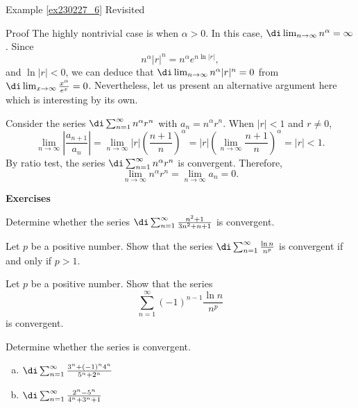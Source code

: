 \begin{example}{\linkt Example \ref{ex230227_6} Revisited}
\begin{example}[label=ex230227_13]{}
\begin{myproof}{Proof}
The highly nontrivial case is when $\alpha>0$. In this case, $\di\lim_{n\to\infty}n^{\alpha}=\infty$. Since
\[n^{\alpha}|r|^n=n^{\alpha}e^{n\ln |r|},\]
and $\ln |r|<0$, we can deduce that $\di \lim_{n\to\infty}n^{\alpha}|r|^n=0$ from $\di\lim_{x\to\infty}\frac{x^{\alpha}}{e^x}=0$. Nevertheless, let us present an alternative argument here which is interesting by its own. 

Consider the series $\di\sum_{n=1}^{\infty}n^{\alpha}r^n$ with $a_n=n^{\alpha}r^n$. When $|r|<1$ and $r\neq 0$,
\[\lim_{n\to\infty}\left|\frac{a_{n+1}}{a_n}\right|=\lim_{n\to\infty}|r|\left(\frac{n+1}{n}\right)^{\alpha}=|r|\left(\lim_{n\to\infty}\frac{n+1}{n}\right)^{\alpha}=|r|<1.\]
By ratio test, the  series $\di\sum_{n=1}^{\infty}n^{\alpha}r^n$ is convergent. Therefore,
\[\lim_{n\to\infty}n^{\alpha}r^n=\lim_{n\to\infty}a_n=0.\]
\end{myproof}
\vp
\noindent
{\bf \large Exercises  \thesection}
\setcounter{myquestion}{1}

\begin{question}{\themyquestion}
Determine whether the series $\di\sum_{n=1}^{\infty}\frac{n^2+1}{3n^2+n+1}$ is convergent.
\end{question}
\atc

\begin{question}{\themyquestion}
Let $p$ be a positive number. Show that the series $\di \sum_{n=1}^{\infty}\frac{\ln n}{n^p}$ is convergent if and only if $p>1$.
\end{question}
\atc

\begin{question}{\themyquestion}
Let $p$ be a positive number. Show that the series \[\sum_{n=1}^{\infty}(-1)^{n-1}\frac{\ln n}{n^p}\] is convergent.
\end{question}
\atc

\begin{question}{\themyquestion}
Determine whether the series is convergent.
\begin{enumerate}[(a)]
\item $\di \sum_{n=1}^{\infty}\frac{3^n+(-1)^n4^n}{5^n+2^n}$
\item  $\di \sum_{n=1}^{\infty}\frac{2^n-5^n}{4^n+3^n+1}$
\end{enumerate}
\end{question}
\atc



\end{example}
\end{example}

